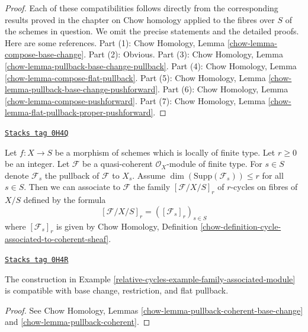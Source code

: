 \begin{proof}
Each of these compatibilities follows directly from the corresponding
results proved in the chapter on Chow homology applied to the fibres
over $S$ of the schemes in question. We omit the precise statements and
the detailed proofs. Here are some references.
Part (1): Chow Homology, Lemma
\ref{chow-lemma-compose-base-change}.
Part (2): Obvious.
Part (3): Chow Homology, Lemma
\ref{chow-lemma-pullback-base-change-pullback}.
Part (4): Chow Homology, Lemma
\ref{chow-lemma-compose-flat-pullback}.
Part (5): Chow Homology, Lemma
\ref{chow-lemma-pullback-base-change-pushforward}.
Part (6): Chow Homology, Lemma
\ref{chow-lemma-compose-pushforward}.
Part (7): Chow Homology, Lemma
\ref{chow-lemma-flat-pullback-proper-pushforward}.
\end{proof}

\begin{example}
\label{relative-cycles-example-family-associated-module}
\href{https://stacks.math.columbia.edu/tag/0H4Q}{\texttt{Stacks tag 0H4Q}}

Let $f : X \to S$ be a morphism of schemes which is locally of finite type.
Let $r \geq 0$ be an integer. Let $\mathcal{F}$ be a quasi-coherent
$\mathcal{O}_X$-module of finite type. For $s \in S$ denote $\mathcal{F}_s$
the pullback of $\mathcal{F}$ to $X_s$.
Assume $\dim(\text{Supp}(\mathcal{F}_s)) \leq r$ for all $s \in S$.
Then we can associate to $\mathcal{F}$ the family $[\mathcal{F}/X/S]_r$ of
$r$-cycles on fibres of $X/S$ defined by the formula
$$
[\mathcal{F}/X/S]_r = ([\mathcal{F}_s]_r)_{s \in S}
$$
where $[\mathcal{F}_s]_r$ is given by Chow Homology, Definition
\ref{chow-definition-cycle-associated-to-coherent-sheaf}.
\end{example}

\begin{lemma}
\label{relative-cycles-lemma-family-associated-module}
\href{https://stacks.math.columbia.edu/tag/0H4R}{\texttt{Stacks tag 0H4R}}

The construction in Example \ref{relative-cycles-example-family-associated-module}
is compatible with base change, restriction, and flat pullback.
\end{lemma}

\begin{proof}
See Chow Homology, Lemmas
\ref{chow-lemma-pullback-coherent-base-change} and
\ref{chow-lemma-pullback-coherent}.
\end{proof}

